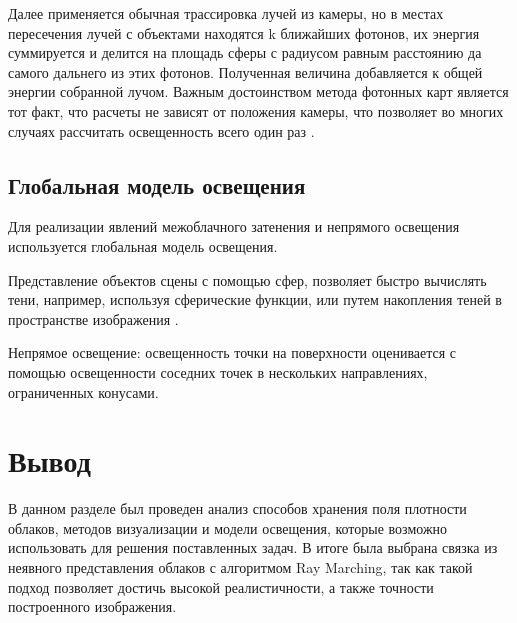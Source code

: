 {	Далее применяется обычная трассировка лучей из камеры, но в местах пересечения лучей с объектами находятся k ближайших фотонов, их энергия суммируется и делится на площадь сферы с радиусом равным расстоянию да самого дальнего из этих фотонов. Полученная величина добавляется к общей энергии собранной лучом. Важным  достоинством  метода  фотонных  карт  является  тот  факт,  что  расчеты  не 
	зависят  от  положения  камеры,  что  позволяет во  многих  случаях  рассчитать  освещенность 
	всего  один  раз \cite{photon}.
	
	\subsection{Глобальная модель освещения}
	
	Для реализации явлений межоблачного затенения и непрямого освещения используется глобальная модель освещения.
	
	Представление объектов сцены с помощью сфер, позволяет быстро вычислять тени, например, используя сферические функции, или путем накопления теней в пространстве изображения \cite{clouds}.
	
	Непрямое освещение: освещенность точки на поверхности оценивается с помощью освещенности соседних точек в нескольких направлениях, ограниченных конусами.
}






\section*{Вывод}

В данном разделе был проведен анализ способов хранения поля плотности облаков, методов визуализации и модели освещения, которые возможно использовать для решения поставленных задач. В итоге была выбрана связка из неявного представления облаков с алгоритмом Ray Marching, так как такой подход позволяет достичь высокой реалистичности, а также точности построенного изображения. 








